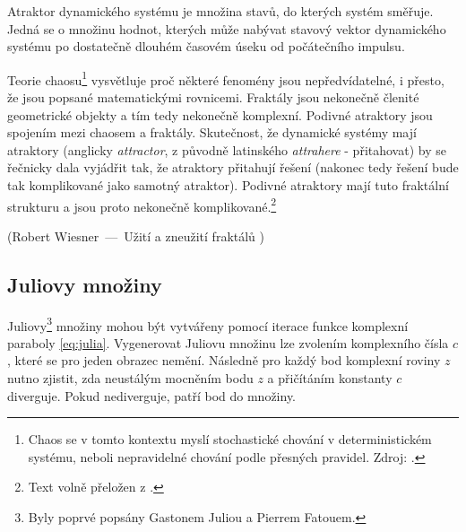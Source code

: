 \documentclass[thesis=B, czech]{FITthesis}[2019/03/06]
\let\oldquote\quote
\let\endoldquote\endquote
\renewenvironment{quote}[2][]
  {\if\relax\detokenize{#1}\relax
     \def\quoteauthor{#2}%
   \else
     \def\quoteauthor{#2~---~#1}%
   \fi
   \oldquote}
  {\par\nobreak\smallskip\hfill(\quoteauthor)%
   \endoldquote\addvspace{\bigskipamount}}
\begin{document}
Atraktor dynamického systému je množina stavů, do kterých systém směřuje. Jedná se o množinu hodnot, kterých může nabývat stavový vektor dynamického systému po dostatečně dlouhém časovém úseku od počátečního impulsu. 

Teorie chaosu\footnote{Chaos se v tomto kontextu myslí stochastické chování v deterministickém systému, neboli nepravidelné chování podle přesných pravidel. Zdroj: \cite{Stewart2009}.} vysvětluje proč některé fenomény jsou nepředvídatelné, i přesto, že jsou popsané matematickými rovnicemi. Fraktály jsou nekonečně členité geometrické objekty a tím tedy nekonečně komplexní. Podivné atraktory jsou spojením mezi chaosem a fraktály. Skutečnost, že dynamické systémy mají atraktory (anglicky \textit{attractor}, z původně latinského \textit{attrahere} - přitahovat) by se řečnicky dala vyjádřit tak, že atraktory přitahují řešení (nakonec tedy řešení bude tak komplikované jako samotný atraktor). Podivné atraktory mají tuto fraktální strukturu a jsou proto nekonečně komplikované.\footnote{Text volně přeložen z \cite{pyke}.}



\begin{quote}[Užití a zneužití fraktálů \cite{Wiesner}]{Robert Wiesner}
\end{quote}


\subsection*{Juliovy množiny}

Juliovy\footnote{Byly poprvé popsány Gastonem Juliou a Pierrem Fatouem.} množiny mohou být vytvářeny pomocí iterace funkce komplexní paraboly \ref{eq:julia}. Vygenerovat Juliovu množinu lze zvolením komplexního čísla $c$, které se pro jeden obrazec nemění. Následně pro každý bod komplexní roviny $z$ nutno zjistit, zda neustálým mocněním bodu $z$ a přičítáním konstanty $c$ diverguje. Pokud nediverguje, patří bod do množiny. 
\end{document}
